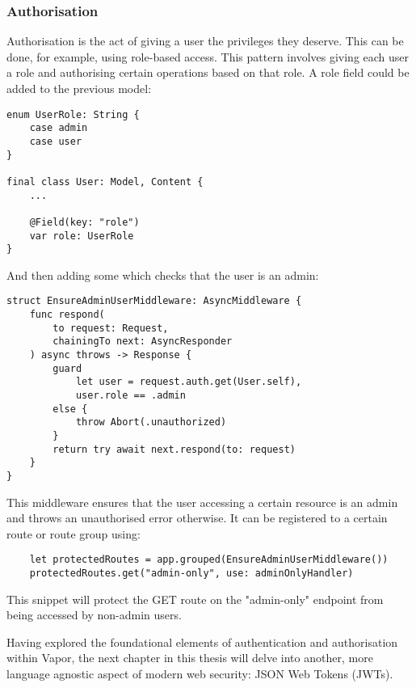 \subsubsection{Authorisation}
Authorisation is the act of giving a user the privileges they deserve. This can be done, for example, using role-based access. This pattern involves giving each user a role and authorising certain operations based on that role. A role field could be added to the previous model:
\begin{verbatim}
enum UserRole: String {
    case admin
    case user
}

final class User: Model, Content {
    ...
    
    @Field(key: "role")
    var role: UserRole
}
\end{verbatim}
And then adding some  which checks that the user is an admin:
\begin{verbatim}
struct EnsureAdminUserMiddleware: AsyncMiddleware {
    func respond(
        to request: Request, 
        chainingTo next: AsyncResponder
    ) async throws -> Response {
        guard 
            let user = request.auth.get(User.self), 
            user.role == .admin 
        else {
            throw Abort(.unauthorized)
        }
        return try await next.respond(to: request)
    }
}
\end{verbatim}
This middleware ensures that the user accessing a certain resource is an admin and throws an unauthorised error otherwise. It can be registered to a certain route or route group using:
\begin{verbatim}
    let protectedRoutes = app.grouped(EnsureAdminUserMiddleware())
    protectedRoutes.get("admin-only", use: adminOnlyHandler)
\end{verbatim}
This snippet will protect the GET route on the "admin-only" endpoint from being accessed by non-admin users. \cite{vapor-docs}

Having explored the foundational elements of authentication and authorisation within Vapor, the next chapter in this thesis will delve into another, more language agnostic aspect of modern web security: JSON Web Tokens (JWTs).
